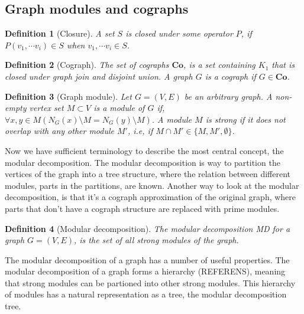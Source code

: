 \documentclass{amsart}
\newtheorem{definition}{Definition}[section]
\begin{document}
\subsection{Graph modules and cographs}
\label{sec:GraphModules}

\begin{definition}[Closure]
    A set $S$ is closed under some operator $P$, if 
    $ P(v_1,\cdots v_i) \in S$ when $v_1,\cdots v_i \in S$.
\end{definition}

\begin{definition}[Cograph]
    The set of cographs $\textbf{Co}$, is a set containing $K_1$ that is closed under 
    graph join and disjoint union. A graph $G$ is a cograph if $G \in \textbf{Co}$.
\end{definition}


\begin{definition}[Graph module]
    Let $G = (V,E)$ be an arbitrary graph. A non-empty vertex set $M \subset V$
    is a module of $G$ if, $\forall x,y \in M (N_G(x) \setminus M = N_G(y) \setminus M)  $. A module $M$ is
    strong if it does not overlap with any other module $M'$, i.e, if 
    $M \cap M' \in \{M,M',\emptyset \}$.
\end{definition}
  

Now we have sufficient terminology to describe the most central concept, the
modular decomposition. The modular decomposition is way to partition the
vertices of the graph into a tree structure, where the relation between
different modules, parts in the partitions, are known. Another way to look at
the modular decomposition, is that it's a cograph approximation of the original
graph, where parts that don't have a cograph structure are replaced with prime
modules.

\begin{definition}[Modular decomposition]
    The modular decomposition MD for a graph $G =(V,E)$, is the set of all
    strong modules of the graph.
\end{definition}

The modular decomposition of a graph has a number of useful properties. The
modular decomposition of a graph forms a hierarchy (REFERENS), meaning that strong modules
can be partioned into other strong modules. This hierarchy of modules has a
natural representation as a tree, the modular decomposition tree.
\end{document}

